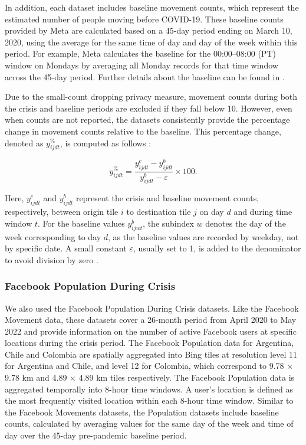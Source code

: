 \documentclass[fleqn,10pt]{wlscirep}
\begin{document}
In addition, each dataset includes baseline movement counts, which represent the estimated number of people moving before COVID-19. These baseline counts provided by Meta are calculated based on a 45-day period ending on March 10, 2020, using the average for the same time of day and day of the week within this period. For example, Meta calculates the baseline for the 00:00–08:00 (PT) window on Mondays by averaging all Monday records for that time window across the 45-day period. Further details about the baseline can be found in \cite{Maas19}.

Due to the small-count dropping privacy measure, movement counts during both the crisis and baseline periods are excluded if they fall below 10. However, even when counts are not reported, the datasets consistently provide the percentage change in movement counts relative to the baseline. This percentage change, denoted as $y^{\%}_{ijdt}$, is computed as follows \cite{Maas19}:

\begin{equation}
y^{\%}_{ijdt} = \dfrac{y^{c}_{ijdt} - y^b_{ijdt}}{y^b_{ijdt} - \varepsilon}\times 100.
\end{equation}

Here, $y^c_{ijdt}$ and $y^b_{ijdt}$ represent the crisis and baseline movement counts, respectively, between origin tile $i$ to destination tile $j$ on day $d$ and during time window $t$. For the baseline values $y^b_{ijwt}$, the subindex $w$ denotes the day of the week corresponding to day $d$, as the baseline values are recorded by weekday, not by specific date. A small constant $\varepsilon$, usually set to 1, is added to the denominator to avoid division by zero \cite{Maas19}.

\subsubsection*{Facebook Population During Crisis}

We also used the Facebook Population During Crisis datasets. Like the Facebook Movement data, these datasets cover a 26-month period from April 2020 to May 2022 and provide information on the number of active Facebook users at specific locations during the crisis period. The Facebook Population data for Argentina, Chile and Colombia are spatially aggregated into Bing tiles at resolution level 11 for Argentina and Chile, and level 12 for Colombia, which correspond to 9.78 $\times$ 9.78 km and 4.89 $\times$ 4.89 km tiles respectively. The Facebook Population data is aggregated temporally into 8-hour time windows. A user's location is defined as the most frequently visited location within each 8-hour time window.
Similar to the Facebook Movements datasets, the Population datasets include baseline counts, calculated by averaging values for the same day of the week and time of day over the 45-day pre-pandemic baseline period.
\end{document}
